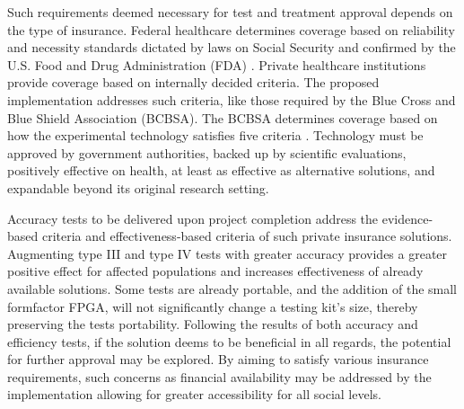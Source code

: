\documentclass[12pt,titlepage]{article}
\begin{document}
Such requirements deemed necessary for test and treatment approval depends on the type of insurance. Federal healthcare determines coverage
based on reliability and necessity standards dictated by laws on Social Security and confirmed by the U.S. Food and Drug Administration (FDA)
\cite{steinberg}. Private healthcare institutions provide coverage based on internally decided criteria. The proposed implementation addresses
such criteria, like those required by the Blue Cross and Blue Shield Association (BCBSA). The BCBSA determines coverage based on how the
experimental technology satisfies five criteria \cite{steinberg}. Technology must be approved by government authorities, backed up by scientific
evaluations, positively effective on health, at least as effective as alternative solutions, and expandable beyond its original research setting.

Accuracy tests to be delivered upon project completion address the evidence-based criteria and effectiveness-based criteria of such private
insurance solutions. Augmenting type III and type IV tests with greater accuracy provides a greater positive effect for affected populations and
increases effectiveness of already available solutions. Some tests are already portable, and the addition of the small formfactor FPGA, will not
significantly change a testing kit’s size, thereby preserving the tests portability. Following the results of both accuracy and efficiency tests,
if the solution deems to be beneficial in all regards, the potential for further approval may be explored. By aiming to satisfy various insurance
requirements, such concerns as financial availability may be addressed by the implementation allowing for greater accessibility for all social levels. 
\end{document}
